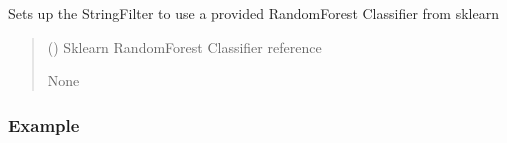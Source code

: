 \documentclass[letterpaper,10pt,english]{sphinxmanual}
\begin{document}
\begin{fulllineitems}
\begin{fulllineitems}
\begin{sphinxVerbatim}[commandchars=\\\{\}]
   
\end{sphinxVerbatim}

\end{fulllineitems}


\begin{fulllineitems}
\label{\detokenize{filters:at_nlp.filters.string_filter.StringFilter.use_random_forest}}
\pysigstartsignatures
{}
\pysigstopsignatures
\sphinxAtStartPar
Sets up the StringFilter to use a provided RandomForest Classifier from sklearn
\begin{quote}\begin{description}
\sphinxAtStartPar
{} () \textendash{} Sklearn RandomForest Classifier reference

\sphinxAtStartPar
None

\end{description}\end{quote}
\subsubsection*{Example}


\end{fulllineitems}
\end{fulllineitems}
\end{document}
